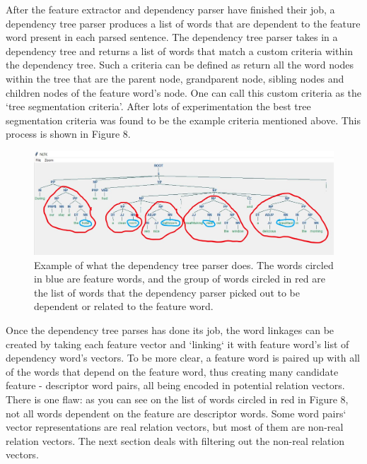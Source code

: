 \documentclass{sig-alternate}
\begin{document}
After the feature extractor and dependency parser have finished their job, a dependency tree parser produces a list of words that are dependent to the feature word present in each parsed sentence. The dependency tree parser takes in a dependency tree and returns a list of words that match a custom criteria within the dependency tree. Such a criteria can be defined as return all the word nodes within the tree that are the parent node, grandparent node, sibling nodes and children nodes of the feature word's node. One can call this custom criteria as the `tree segmentation criteria'. After lots of experimentation the best tree segmentation criteria was found to be the example criteria mentioned above. This process is shown in Figure 8. 

\begin{figure}
\centering
\includegraphics[scale=0.25]{images/dep_tree_parsing.JPG}
\caption{Example of what the dependency tree parser does. The words circled in blue are feature words, and the group of words circled in red are the list of words that the dependency parser picked out to be dependent or related to the feature word.}
\end{figure}

Once the dependency tree parses has done its job, the word linkages can be created by taking each feature vector and `linking` it with feature word's list of dependency word's vectors. To be more clear, a feature word is paired up with all of the words that depend on the feature word, thus creating many candidate feature - descriptor word pairs, all being encoded in potential relation vectors. There is one flaw: as you can see on the list of words circled in red in Figure 8, not all words dependent on the feature are descriptor words. Some word pairs` vector representations are real relation vectors, but most of them are non-real relation vectors. The next section deals with filtering out the non-real relation vectors.
\end{document}

